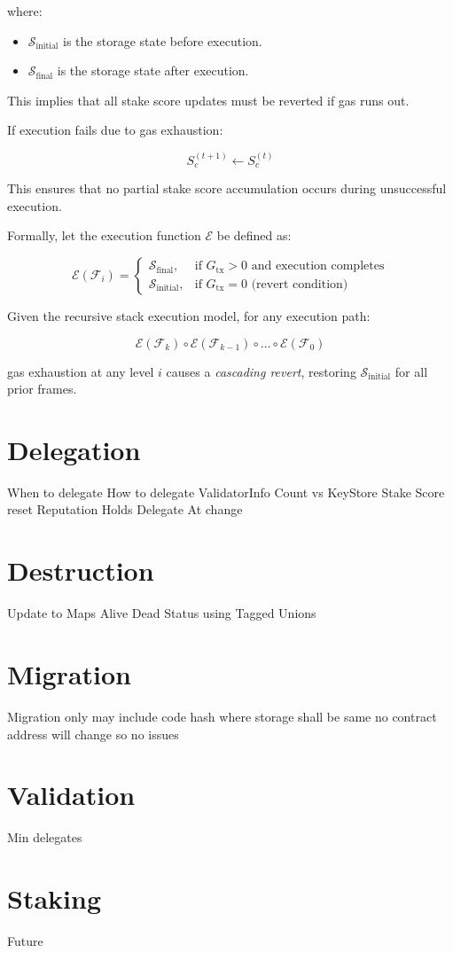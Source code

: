 \documentclass{article}
\begin{document}
where:
\begin{itemize}
    \item \( \mathcal{S}_{\text{initial}} \) is the storage state before execution.
    \item \( \mathcal{S}_{\text{final}} \) is the storage state after execution.
\end{itemize}

This implies that all stake score updates must be reverted if gas runs out.

If execution fails due to gas exhaustion:

\begin{equation}
S_c^{(t+1)} \gets S_c^{(t)}
\end{equation}

This ensures that no partial stake score accumulation occurs during unsuccessful execution.

Formally, let the execution function \( \mathcal{E} \) be defined as:

\begin{equation}
\mathcal{E}(\mathcal{F}_i) =
\begin{cases}
\mathcal{S}_{\text{final}}, & \text{if } G_{\text{tx}} > 0 \text{ and execution completes} \\
\mathcal{S}_{\text{initial}}, & \text{if } G_{\text{tx}} = 0 \text{ (revert condition)}
\end{cases}
\end{equation}

Given the recursive stack execution model, for any execution path:

\begin{equation}
\mathcal{E}(\mathcal{F}_k) \circ \mathcal{E}(\mathcal{F}_{k-1}) \circ \dots \circ \mathcal{E}(\mathcal{F}_0)
\end{equation}

gas exhaustion at any level \( i \) causes a \textit{cascading revert}, restoring \( \mathcal{S}_{\text{initial}} \) for all prior frames.


\section{Delegation}

When to delegate 
How to delegate 
ValidatorInfo 
Count vs KeyStore
Stake Score reset 
Reputation Holds 
Delegate At change 

\section{Destruction}

Update to Maps 
Alive Dead Status using Tagged Unions

\section{Migration}

Migration only may include code hash where storage shall be same 
no contract address will change so no issues 

\section{Validation}

Min delegates 

\section{Staking}

Future
\end{document}
